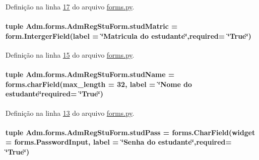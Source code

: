 Definição na linha \hyperlink{Adm_2forms_8py_source_l00017}{17} do arquivo \hyperlink{Adm_2forms_8py_source}{forms.\-py}.

\hypertarget{classAdm_1_1forms_1_1AdmRegStuForm_a3952916b9a15da1d6f5aef0fe70ca37a}{
\paragraph[{stud\-Matric}]{\setlength{\rightskip}{0pt plus 5cm}tuple Adm.\-forms.\-Adm\-Reg\-Stu\-Form.\-stud\-Matric = form.\-Interger\-Field(label = \char`\"{}Matricula do estudante\char`\"{},required= \char`\"{}True\char`\"{})\hspace{0.3cm}{\ttfamily [static]}}}\label{classAdm_1_1forms_1_1AdmRegStuForm_a3952916b9a15da1d6f5aef0fe70ca37a}


Definição na linha \hyperlink{Adm_2forms_8py_source_l00015}{15} do arquivo \hyperlink{Adm_2forms_8py_source}{forms.\-py}.

\hypertarget{classAdm_1_1forms_1_1AdmRegStuForm_a148f5094b9746641dc5787e2d2f9b442}{
\paragraph[{stud\-Name}]{\setlength{\rightskip}{0pt plus 5cm}tuple Adm.\-forms.\-Adm\-Reg\-Stu\-Form.\-stud\-Name = forms.\-char\-Field(max\-\_\-length = 32, label = \char`\"{}Nome do estudante\char`\"{}required= \char`\"{}True\char`\"{})\hspace{0.3cm}{\ttfamily [static]}}}\label{classAdm_1_1forms_1_1AdmRegStuForm_a148f5094b9746641dc5787e2d2f9b442}


Definição na linha \hyperlink{Adm_2forms_8py_source_l00013}{13} do arquivo \hyperlink{Adm_2forms_8py_source}{forms.\-py}.

\hypertarget{classAdm_1_1forms_1_1AdmRegStuForm_a64f5a91780fe16298e824629a7315327}{
\paragraph[{stud\-Pass}]{\setlength{\rightskip}{0pt plus 5cm}tuple Adm.\-forms.\-Adm\-Reg\-Stu\-Form.\-stud\-Pass = forms.\-Char\-Field(widget = forms.\-Password\-Input, label = \char`\"{}Senha do estudante\char`\"{},required= \char`\"{}True\char`\"{})\hspace{0.3cm}{\ttfamily [static]}}}\label{classAdm_1_1forms_1_1AdmRegStuForm_a64f5a91780fe16298e824629a7315327}



